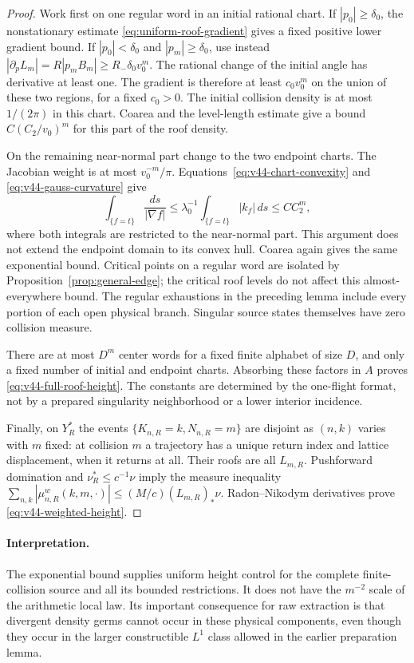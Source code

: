 \begin{proof}
Work first on one regular word in an initial rational chart. If
$|p_0|\ge\delta_0$, the nonstationary estimate
\eqref{eq:uniform-roof-gradient} gives a fixed positive lower gradient
bound. If $|p_0|<\delta_0$ and $|p_m|\ge\delta_0$, use instead
$|\partial_p L_m|=R|p_m B_m|\ge R_-\delta_0v_0^m$.
The rational change of the initial angle has derivative at least one.
The gradient is therefore at least $c_0v_0^m$ on the union of these
two regions, for a fixed $c_0>0$. The initial collision density is at
most $1/(2\pi)$ in this chart. Coarea and the level-length estimate
give a bound $C(C_2/v_0)^m$ for this part of the roof density.

On the remaining near-normal part change to the two endpoint charts.
The Jacobian weight is at most $v_0^{-m}/\pi$.
Equations~\eqref{eq:v44-chart-convexity} and
\eqref{eq:v44-gauss-curvature} give
\[
 \int_{\{f=t\}}\frac{ds}{|\nabla f|}
       \le\lambda_0^{-1}\int_{\{f=t\}}|k_f|\,ds
       \le CC_2^m,
\]
where both integrals are restricted to the near-normal part. This
argument does not extend the endpoint domain to its convex hull.
Coarea again gives the same exponential bound. Critical points on a
regular word are isolated by Proposition~\ref{prop:general-edge};
the critical roof levels do not affect this almost-everywhere bound.
The regular exhaustions in the preceding lemma include every portion
of each open physical branch. Singular source states themselves have
zero collision measure.

There are at most $D^m$ center words for a fixed finite alphabet of
size $D$, and only a fixed number of initial and endpoint charts.
Absorbing these factors in $A$ proves \eqref{eq:v44-full-roof-height}.
The constants are determined by the one-flight format, not by a
prepared singularity neighborhood or a lower interior incidence.

Finally, on $Y_R^*$ the events
$\{K_{n,R}=k,N_{n,R}=m\}$ are disjoint as $(n,k)$ varies with $m$
fixed: at collision $m$ a trajectory has a unique return index and
lattice displacement, when it returns at all. Their roofs are all
$L_{m,R}$. Pushforward domination and
$\nu_R^*\le c^{-1}\nu$ imply the measure inequality
$\sum_{n,k}|\mu^w_{n,R}(k,m,\cdot)|\le (M/c)(L_{m,R})_*\nu$.
Radon--Nikodym derivatives prove \eqref{eq:v44-weighted-height}.
\end{proof}

\paragraph{Interpretation.}
The exponential bound supplies uniform height control for the complete
finite-collision source and all its bounded restrictions. It does not
have the $m^{-2}$ scale of the arithmetic local law. Its important
consequence for raw extraction is that divergent density germs cannot
occur in these physical components, even though they occur in the
larger constructible $L^1$ class allowed in the earlier preparation lemma.
